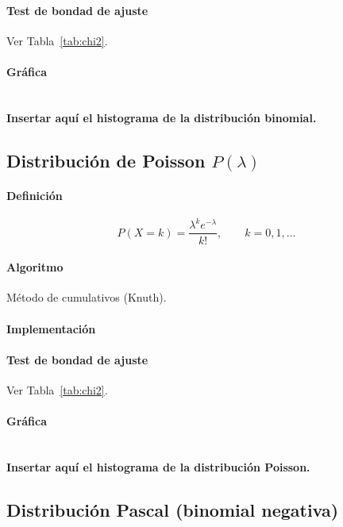 \documentclass[11pt,a4paper]{article}
\begin{document}
\paragraph{Test de bondad de ajuste}
Ver Tabla~\ref{tab:chi2}.

\paragraph{Gráfica}\\
\textbf{Insertar aquí el histograma de la distribución binomial.}

\subsection{Distribución de Poisson $P(\lambda)$}
\paragraph{Definición}
\[
P(X=k)=\frac{\lambda^{k}e^{-\lambda}}{k!},\qquad k=0,1,\dots
\]

\paragraph{Algoritmo}
Método de cumulativos (Knuth).

\paragraph{Implementación}


\paragraph{Test de bondad de ajuste}
Ver Tabla~\ref{tab:chi2}.

\paragraph{Gráfica}\\
\textbf{Insertar aquí el histograma de la distribución Poisson.}

\subsection{Distribución Pascal (binomial negativa)}
\end{document}

